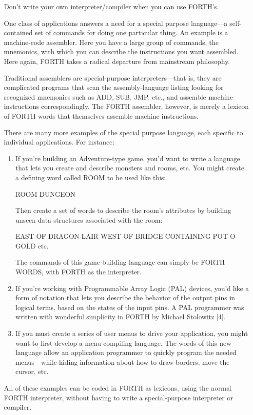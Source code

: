 \begin{tip}
Don't write your own interpreter/compiler when you can use FORTH's.
\end{tip}
One class of applications answers a need for a special purpose
language---a self-contained set of commands for doing one particular
thing. An example is a machine-code assembler. Here you have a large
group of commands, the mnemonics, with which you can describe the
instructions you want assembled. Here again, FORTH takes a radical
departure from mainstream philosophy.

Traditional assemblers are special-purpose interpreters---that is,
they are complicated programs that scan the assembly-language listing
looking for recognized mnemonics such as ADD, SUB, JMP, etc., and
assemble machine instructions correspondingly. The FORTH assembler,
however, is merely a lexicon of FORTH words that themselves assemble
machine instructions.

There are many more examples of the special purpose language,
each specific to individual applications. For instance:

\begin{enumerate}
\item If you're building an Adventure-type game, you'd want to write a language
that lets you create and describe monsters and rooms, etc. You might
create a defining word called ROOM to be used like this:

\begin{Code}
ROOM DUNGEON
\end{Code}

Then create a set of words to describe the room's attributes by building
unseen data structures associated with the room:

\begin{Code}
EAST-OF DRAGON-LAIR
WEST-OF BRIDGE
CONTAINING POT-O-GOLD
etc.
\end{Code}

The commands of this game-building language can simply be FORTH
WORDS, with FORTH as the interpreter.

\item If you're working with Programmable Array Logic (PAL) devices, you'd
like a form of notation that lets you describe the behavior of the output pins
in logical terms, based on the states of the input pins. A PAL programmer
was written with wonderful simplicity in FORTH by Michael Stolowitz [4].

\item If you must create a series of user menus to drive your application, you
might want to first develop a menu-compiling language. The words of this
new language allow an application programmer to quickly program the
needed menus---while hiding information about how to draw borders, move
the cursor, etc.
\end{enumerate}
All of these examples can be coded in FORTH as lexicons, using the normal
FORTH interpreter, without having to write a special-purpose interpreter
or compiler.

